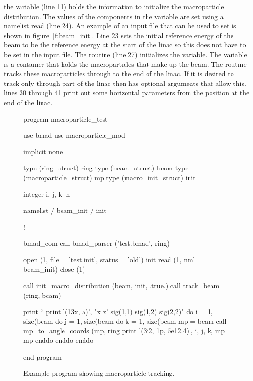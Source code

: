 {{{{{{{{{{{{the  variable (line 11) holds the information to initialize
the macroparticle distribution. The values of the components in the
 variable are set using a namelist read (line 24). An example
of an input file that can be used to set  is shown in
figure~\ref{f:beam_init}. Line 23 sets the initial reference energy of
the beam to be the reference energy at the start of the linac so this
does not have to be set in the input file.  The
 routine (line 27) initializes the
 variable. The  variable is a container that holds
the macroparticles that make up the beam. The  routine
tracks these macroparticles through to the end of the linac. If it is
desired to track only through part of the linac then 
has optional arguments that allow this. lines 30 through 41 print out
some horizontal parameters from the position at the end of the linac.


\begin{figure}
\begin{listing}{1}
program macroparticle_test

  use bmad
  use macroparticle_mod

  implicit none

  type (ring_struct) ring
  type (beam_struct) beam
  type (macroparticle_struct) mp
  type (macro_init_struct) init

  integer i, j, k, n

  namelist / beam_init / init

!

  bmad_com%
  call bmad_parser ('test.bmad', ring)

  open (1, file = 'test.init', status = 'old')
  init%
  read (1, nml = beam_init)
  close (1)

  call init_macro_distribution (beam, init, .true.)
  call track_beam (ring, beam)

  print *
  print '(13x, a)', "x          x'    sig(1,1)    sig(1,2)    sig(2,2)"
  do i = 1, size(beam%
    do j = 1, size(beam%
      do k = 1, size(beam%
        mp = beam%
        call mp_to_angle_coords (mp, ring%
        print '(3i2, 1p, 5e12.4)', i, j, k, mp%
                  mp%
      enddo
    enddo
  enddo

end program
\end{listing}
\caption{Example program showing macroparticle tracking.}
\label{f:macro_program}
\end{figure}

}}}}}}}}}}}}
